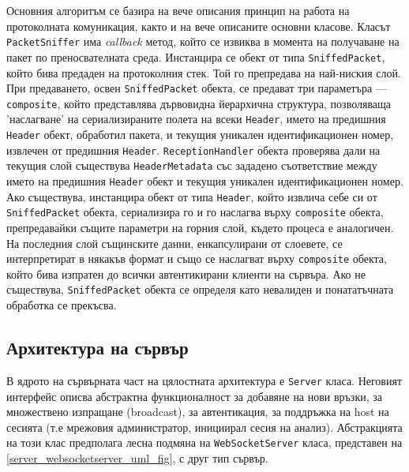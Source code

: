 \documentclass[12pt,a4paper,oneside]{book}
\begin{document}
Основния алгоритъм се базира на вече описания принцип на работа на протоколната
комуникация, както и на вече описаните основни класове. Класът
\texttt{PacketSniffer} има \textit{callback} метод, който се извиква
в момента на получаване на пакет по преносвателната среда. Инстанцира се обект
от типа \texttt{SniffedPacket}, който бива предаден на протоколния стек. Той го
препредава на най-ниския слой. При предаването, освен \texttt{SniffedPacket} обекта, се
предават три параметъра ---
\texttt{composite}, който представлява дървовидна йерархична структура,
позволяваща 'наслагване' на сериализираните полета на
всеки \texttt{Header}, името на предишния \texttt{Header} обект, обработил пакета, и текущия уникален
идентификационен номер, извлечен от предишния \texttt{Header}. \texttt{ReceptionHandler} обекта
проверява дали на текущия слой съществува \texttt{HeaderMetadata} със зададено
съответствие между името на предишния \texttt{Header} обект и текущия уникален
идентификационен номер. Ако
съществува, инстанцира обект от типа \texttt{Header}, който извлича себе си от
\texttt{SniffedPacket} обекта, сериализира го и го наслагва върху
\texttt{composite}
обекта, препредавайки същите параметри на горния слой, където процеса е
аналогичен. На последния слой същинските данни, енкапсулирани от слоевете, се
интерпретират в някакъв формат и също се наслагват върху \texttt{composite} обекта,
който бива изпратен до всички автентикирани клиенти на сървъра. Ако не
съществува,
\texttt{SniffedPacket} обекта се определя като невалиден и понататъчната
обработка се прекъсва.

\subsection{Архитектура на сървър}

В ядрото на сървърната част на цялостната архитектура е \texttt{Server} класа.
Неговият интерфейс описва абстрактна функционалност за добавяне на нови връзки,
за множествено изпращане (broadcast), за автентикация, за поддръжка на host на
сесията (т.е мрежовия администратор, инициирал сесия на анализ). Абстракцията на
този клас предполага лесна подмяна на \texttt{WebSocketServer} класа, представен
на \autoref{server_websocketserver_uml_fig}, с друг тип
сървър.
\end{document}
